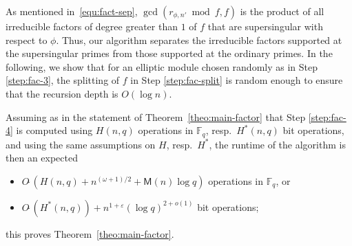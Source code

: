 \documentclass[12pt]{article}
\theoremstyle{plain}
\theoremstyle{definition}
\newcommand{\tildO}{O\tilde{~}}
\def\F{\ensuremath{\mathbb{F}}}
\def\MM{\ensuremath{\mathsf{M}}}
\begin{document}
As mentioned in~\eqref{equ:fact-sep}, $\gcd(r_{\phi,n'} \bmod f, f)$
is the product of all irreducible factors of degree greater than $1$
of $f$ that are supersingular with respect to $\phi$. Thus, our
algorithm separates the irreducible factors supported at the
supersingular primes from those supported at the ordinary primes. In
the following, we show that for an elliptic module chosen randomly as
in Step \ref{step:fac-3}, the splitting of $f$ in Step
\ref{step:fac-split} is random enough to ensure that the recursion
depth is $O(\log n)$.

Assuming as in the statement of Theorem~\ref{theo:main-factor} that
Step \ref{step:fac-4} is computed using $H(n,q)$ operations in $\F_q$,
resp.\ $H^*(n,q)$ bit operations, and using the same assumptions
on $H$, resp.\ $H^*$, the runtime of the algorithm is then an expected
\begin{itemize}
\item $\tildO(H(n,q)  + n^{(\omega+1)/2} + \MM(n)\log q )$ operations in $\F_q$, or
\item $\tildO(H^*(n,q)) + n^{1+\varepsilon}(\log q)^{2+o(1)}$ bit operations;
\end{itemize}
this proves Theorem~\ref{theo:main-factor}. 
\end{document}
